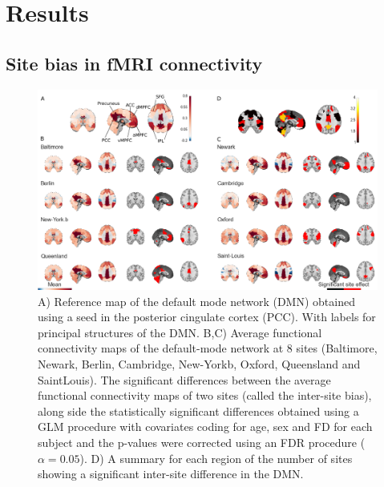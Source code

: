 \documentclass[authoryear]{elsarticle}
\begin{document}
\section{Results}

\subsection{Site bias in fMRI connectivity}


\begin{figure}[tbp]
\begin{center}
\includegraphics[width=\linewidth]{../figures/dmn_multisite.png}
\end{center}
\caption[DMN variability across sites]{
A) Reference map of the default mode network (DMN) obtained using a seed in the posterior cingulate cortex (PCC). With labels for principal structures of the DMN.
B,C) Average functional connectivity maps of the default-mode network at 8 sites (Baltimore, Newark, Berlin, Cambridge, New-Yorkb, Oxford, Queensland and SaintLouis). The significant differences between the average functional connectivity maps of two sites (called the inter-site bias), along side the statistically significant  differences obtained using a GLM procedure with covariates coding for age, sex and FD for each subject and the p-values were corrected using an FDR procedure ($\alpha=0.05$).
D) A summary for each region of the number of sites showing a significant inter-site difference in the DMN.
}
\label{fig_DMN_variability}
\end{figure}
\end{document}
